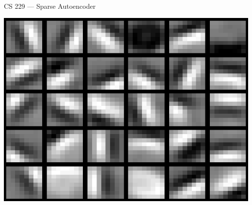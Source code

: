 \documentclass[12pt]{article}
\begin{document}
{}
{CS 229 --- Sparse Autoencoder}

\begin{center}
  \includegraphics[scale=0.6]{squares.png}
\end{center}



\end{document}
